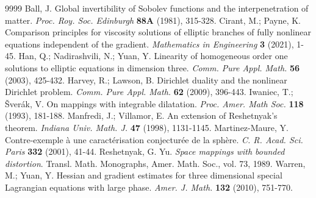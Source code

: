 \documentclass{amsart}
\theoremstyle{definition}
\theoremstyle{remark}
\begin{document}
\begin{thebibliography}{9999}
 Ball, J. Global invertibility of Sobolev functions and the interpenetration of matter. {\it Proc. Roy. Soc. Edinburgh} {\bf 88A} (1981), 315-328.
 Cirant, M.; Payne, K. Comparison principles for viscosity solutions of elliptic branches of fully nonlinear equations independent of the gradient. {\it Mathematics in Engineering} {\bf 3} (2021), 1-45.
 Han, Q.; Nadirashvili, N.; Yuan, Y. Linearity of homogeneous order one solutions to elliptic equations in dimension three. {\it Comm. Pure Appl. Math.} {\bf 56} (2003), 425-432.
 Harvey, R.; Lawson, B. Dirichlet duality and the nonlinear Dirichlet problem. {\it Comm. Pure Appl. Math.} {\bf 62} (2009), 396-443.
 Iwaniec, T.; \v{S}ver\'{a}k, V.  On mappings with integrable dilatation. {\it Proc. Amer. Math Soc.} {\bf 118} (1993), 181-188.
 Manfredi, J.; Villamor, E. An extension of Reshetnyak's theorem. {\it Indiana Univ. Math. J.} {\bf 47} (1998), 1131-1145.
 Martinez-Maure, Y. Contre-exemple \`{a} une caract\'{e}risation conjectur\'{e}e de la sph\`{e}re. {\it C. R. Acad. Sci. Paris} {\bf 332} (2001), 41-44.
 Reshetnyak, G. Yu. {\it Space mappings with bounded distortion}. Transl. Math. Monographs, Amer. Math. Soc., vol. 73, 1989.
 Warren, M.; Yuan, Y. Hessian and gradient estimates for three dimensional special Lagrangian equations with large phase. {\it Amer. J. Math.} {\bf 132} (2010), 751-770.
\end{thebibliography}
\end{document}
